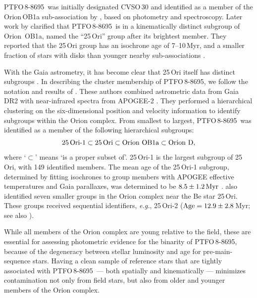 \documentclass[12pt,twocolumn,tighten,trackchanges]{aastex62}
\newcommand{\ptfo}{PTFO$\,$8-8695}
\begin{document}
\ptfo\ was initially designated CVSO\,30 and identified as a member of
the Orion$\,$OB1a sub-association by \citet{briceno_cida_2005}, based
on photometry and spectroscopy.  Later work by \citet{briceno_25_2007}
clarified that \ptfo\ is in a kinematically distinct subgroup of
Orion~OB1a, named the ``25$\,$Ori'' group after its brightest member.
They reported that the 25$\,$Ori group has an isochrone age of
7--10$\,$Myr, and a smaller fraction of stars with disks than younger
nearby sub-associations \citep{hernandez_spitzer_ob1_2007}.

With the Gaia astrometry, it has become clear that 25$\,$Ori itself
has distinct subgroups
\citep{kounkel_apogee2_2018,briceno_cidaII_2019}.  In describing the
cluster membership of \ptfo, we follow the notation and results of
\citet{kounkel_apogee2_2018}.  These authors combined astrometric data
from Gaia DR2 with near-infrared spectra from APOGEE-2
\citep{gunn_sdss_2006,majewski_apache_2017,blanton_sloan_2017,zasowski_target_2017,cottle_apogee2_2018}.
They performed a hierarchical clustering on the six-dimensional
position and velocity information to identify subgroups within the
Orion complex.  From smallest to largest, \ptfo\ was identified as a
member of the following hierarchical subgroups:
\begin{equation}
  {\rm 25\,Ori\text{-}1}
  \subset {\rm 25\,Ori}
  \subset {\rm Orion\ OB1a}
  \subset {\rm Orion\ D},
\end{equation}
where `$\subset$' means `is a proper subset of'.  25$\,$Ori-1 is the
largest subgroup of 25$\,$Ori, with 149 identified members.  The mean
age of the 25$\,$Ori-1 subgroup, determined by fitting isochrones to
group members with APOGEE effective temperatures and Gaia parallaxes,
was determined to be $8.5\pm1.2\,{\rm Myr}$ \citep[see][Section
2.3]{kounkel_apogee2_2018}.  \citet{kounkel_apogee2_2018} also
identified seven smaller groups in the Orion complex near the Be star
25$\,$Ori. These groups received sequential identifiers, {\it e.g.},
25$\,$Ori-2 (${\rm Age} =12.9\pm2.8\,$Myr; see also
\citealt{briceno_cidaII_2019}).

 {While all members of the Orion complex are young relative to
the field,} these  are essential for
assessing  photometric evidence for the binarity of
\ptfo, because of the degeneracy between stellar luminosity and age
for pre-main-sequence stars.  Having a clean sample of reference stars
that are tightly associated with \ptfo\ --- both spatially and
kinematically --- minimizes contamination not only from field stars,
but also from older and younger members of the Orion complex.
\end{document}
